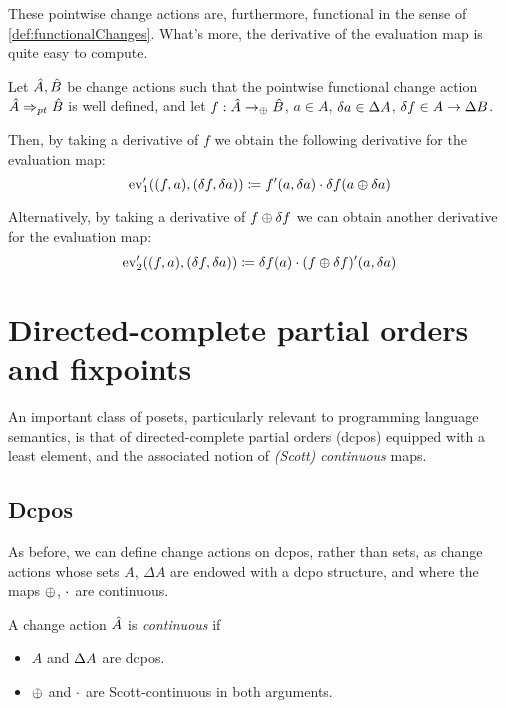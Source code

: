 These pointwise change actions are, furthermore, functional in the sense of 
\cref{def:functionalChanges}. What's more, the derivative of the evaluation map is quite easy to 
compute.
\begin{prop}
\label{prop:evDerivatives}
  Let $\hat{A}, \hat{B}$ be change actions such that the pointwise functional change action
  $\hat{A} \Rightarrow_{pt} \hat{B}$ is well defined, and let
  $f: \hat{A} \rightarrow_\oplus \hat{B}$,
  $a \in A$, $\delta a \in \Delta A$,
  $\delta f \in A \rightarrow \Delta B$.

  Then, by taking a derivative of $f$ we obtain the following derivative for the evaluation map:
  \begin{displaymath}
    \operatorname{ev}'_1((f, a), (\delta f, \delta a)) 
    \coloneqq f'(a, \delta a) \cdot \delta f(a \oplus \delta a)
  \end{displaymath}

  Alternatively, by taking a derivative of $f \oplus \delta f$ we can obtain another derivative
  for the evaluation map:
  \begin{displaymath}
    \operatorname{ev}'_2((f, a), (\delta f, \delta a)) 
    \coloneqq \delta f(a) \cdot (f \oplus \delta f)'(a, \delta a)
  \end{displaymath}
\end{prop}

\section{Directed-complete partial orders and fixpoints}

An important class of posets, particularly relevant to programming language semantics, is that of 
directed-complete partial orders (dcpos) equipped with a least element, and the associated notion of \emph{(Scott) continuous} maps. 

\subsection{Dcpos}
\label{sec:dcpos}

As before, we can define change actions on dcpos, rather than sets, as change
actions whose sets $A$, $\Delta A$ are endowed with a dcpo structure, and where
the maps $\oplus$, $\cdot$ are continuous.

\begin{defn}
  A change action $\hat{A}$ is \emph{continuous} if
  \begin{itemize}
    \item $A$ and $\Delta A$ are dcpos.
    \item $\oplus$ and $\cdot$ are Scott-continuous in both arguments.
  \end{itemize}
\end{defn}

